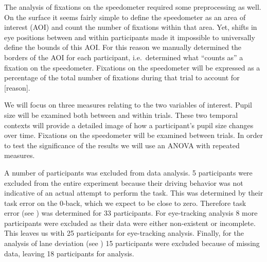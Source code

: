 The analysis of fixations on the speedometer required some preprocessing as well.
On the surface it seems fairly simple to define the speedometer as an area of interest (AOI) and count the number of fixations within that area.
Yet, shifts in eye positions between and within participants made it impossible to universally define the bounds of this AOI.\@
For this reason we manually determined the borders of the AOI for each participant, i.e.\ determined what ``counts as'' a fixation on the speedometer.
Fixations on the speedometer will be expressed as a percentage of the total number of fixations during that trial to account for [reason].

We will focus on three measures relating to the two variables of interest. 
Pupil size will be examined both between and within trials.
These two temporal contexts will provide a detailed image of how a participant's pupil size changes over time.
Fixations on the speedometer will be examined between trials. 
In order to test the significance of the results we will use an ANOVA with repeated measures.

A number of participants was excluded from data analysis.
5 participants were excluded from the entire experiment because their driving behavior was not indicative of an actual attempt to perform the task.
This was determined by their task error on the 0-back, which we expect to be close to zero.
Therefore task error (see \citet{DeMooij2021}) was determined for 33 participants.
For eye-tracking analysis 8 more participants were excluded as their data were either non-existent or incomplete.
This leaves us with 25 participants for eye-tracking analysis.
Finally, for the analysis of lane deviation (see \citet{Kelapanda2021}) 15 participants were excluded because of missing data, leaving 18 participants for analysis.
